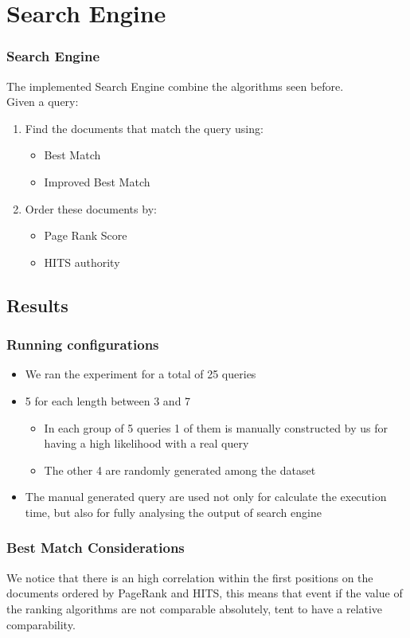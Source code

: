 \documentclass{beamer}
\begin{document}
\section{Search Engine}
\begin{frame}
\frametitle{Search Engine}
The implemented Search Engine combine the algorithms seen before.\\ 
Given a query:
\begin{enumerate}
\item Find the documents that match the query using:
\begin{itemize}
\item Best Match
\item Improved Best Match
\end{itemize}
\item Order these documents by:
\begin{itemize}
\item Page Rank Score
\item HITS authority
\end{itemize}
\end{enumerate}
\end{frame}

\subsection{Results}
\begin{frame}
\frametitle{Running configurations}
\begin{itemize}
\item We ran the experiment for a total of 25 queries
\item 5 for each length between 3 and 7
\begin{itemize}
\item In each group of 5 queries 1 of them is manually constructed by us for having a high likelihood with a real query
\item The other 4 are randomly generated among the dataset
\end{itemize} 
\item The manual generated  query are used not only for calculate the execution time, but also for fully analysing the output of search engine
\end{itemize}
\end{frame}

\begin{frame}
\frametitle{Best Match Considerations}
We notice that there is an \alert{high} correlation within the first positions on the documents ordered by PageRank and HITS, this means that event if the value of the ranking algorithms are not comparable absolutely, tent to have a \alert{relative} comparability.
\end{frame}
\end{document}
